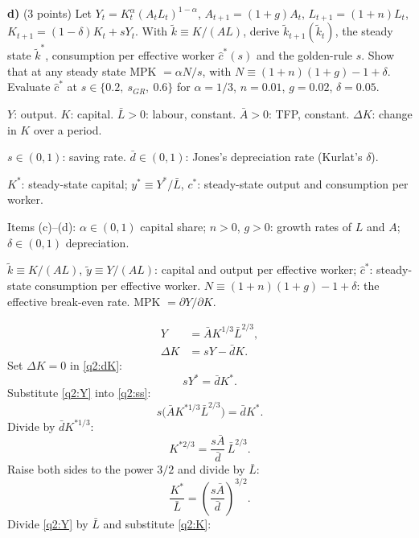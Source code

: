\textbf{d)} (3 points) Let $Y_t=K_t^\alpha(A_tL_t)^{1-\alpha}$, $A_{t+1}=(1+g)A_t$, $L_{t+1}=(1+n)L_t$, $K_{t+1}=(1-\delta)K_t+sY_t$. With
$\tilde k\equiv K/(AL)$, derive $\tilde k_{t+1}(\tilde k_t)$, the steady state $\tilde k^\ast$, consumption per effective worker $\hat c^\ast(s)$ and
the golden-rule $s$. Show that at any steady state MPK $=\alpha N/s$, with $N\equiv(1+n)(1+g)-1+\delta$. Evaluate $\hat c^\ast$ at
$s\in\{0.2,\ s_{GR},\ 0.6\}$ for $\alpha=1/3$, $n=0.01$, $g=0.02$, $\delta=0.05$.
\resolespaco
\begin{sol}
\begin{notacao}
\item $Y$: output. $K$: capital. $\bar L>0$: labour, constant. $\bar A>0$: TFP, constant. $\Delta K$: change in $K$ over a period.
\item $s\in(0,1)$: saving rate. $\bar d\in(0,1)$: Jones's depreciation rate (Kurlat's $\delta$).
\item $K^\ast$: steady-state capital; $y^\ast\equiv Y^\ast/\bar L$, $c^\ast$: steady-state output and consumption per worker.
\item Items (c)--(d): $\alpha\in(0,1)$ capital share; $n>0$, $g>0$: growth rates of $L$ and $A$; $\delta\in(0,1)$ depreciation.
\item $\tilde k\equiv K/(AL)$, $\tilde y\equiv Y/(AL)$: capital and output per effective worker; $\hat c^\ast$: steady-state consumption
per effective worker. $N\equiv(1+n)(1+g)-1+\delta$: the effective break-even rate. MPK $=\partial Y/\partial K$.
\end{notacao}
\begin{align}
Y &= \bar AK^{1/3}\bar L^{2/3}, \label{q2:Y}\\
\Delta K &= sY-\bar dK. \label{q2:dK}
\end{align}
Set $\Delta K=0$ in \eqref{q2:dK}:
\begin{equation}
sY^\ast=\bar dK^\ast. \label{q2:ss}
\end{equation}
Substitute \eqref{q2:Y} into \eqref{q2:ss}:
\[
s\big(\bar AK^{\ast1/3}\bar L^{2/3}\big)=\bar dK^\ast .
\]
Divide by $\bar dK^{\ast1/3}$:
\[
K^{\ast2/3}=\frac{s\bar A}{\bar d}\,\bar L^{2/3} .
\]
Raise both sides to the power $3/2$ and divide by $\bar L$:
\begin{equation}
\frac{K^\ast}{\bar L}=\left(\frac{s\bar A}{\bar d}\right)^{3/2}. \label{q2:K}
\end{equation}
Divide \eqref{q2:Y} by $\bar L$ and substitute \eqref{q2:K}:
\begin{align}

\end{align}
\end{sol}
